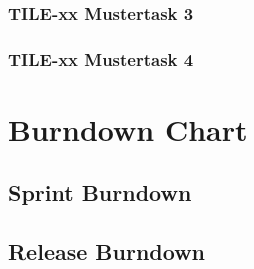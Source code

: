 \documentclass[alpha]{tile-sprint} %
\begin{document}
\subsubsection{TILE-xx Mustertask 3}
\subsubsection{TILE-xx Mustertask 4}


\section{Burndown Chart}
\subsection{Sprint Burndown}
\subsection{Release Burndown}
\end{document}
